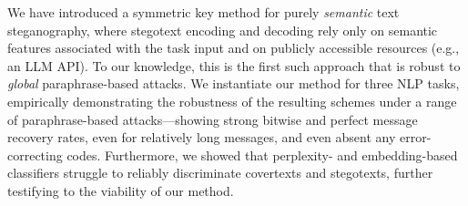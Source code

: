 We have introduced a symmetric key method for purely \emph{semantic} text steganography, where stegotext encoding and decoding rely only on semantic features associated with the task input and on publicly accessible resources (e.g., an LLM API). To our knowledge, this is the first such approach that is robust to \emph{global} paraphrase-based attacks. We instantiate our method for three NLP tasks, empirically demonstrating the robustness of the resulting schemes under a range of paraphrase-based attacks---showing strong bitwise and perfect message recovery rates, even for relatively long messages, and even absent any error-correcting codes. Furthermore, we showed that perplexity- and embedding-based classifiers struggle to reliably discriminate covertexts and stegotexts, further testifying to the viability of our method.